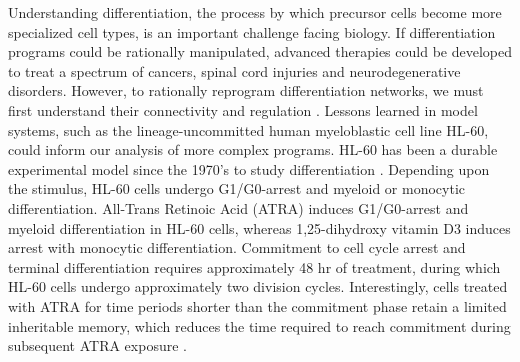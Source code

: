 \documentclass[12pt]{article}
\begin{document}
Understanding differentiation, 
the process by which precursor cells become more specialized cell types, 
is an important challenge facing biology. 
If differentiation programs could be rationally manipulated, 
advanced therapies could be developed to treat a spectrum of cancers, spinal cord injuries and neurodegenerative disorders. 
However, to rationally reprogram differentiation networks, 
we must first understand their connectivity and regulation \cite{Young2011}. 
Lessons learned in model systems, such as the lineage-uncommitted human myeloblastic cell line HL-60,
could inform our analysis of more complex programs. 
HL-60 has been a durable experimental model since the 1970's to study differentiation \cite{Breitman1980}.
Depending upon the stimulus, HL-60 cells undergo G1/G0-arrest and myeloid or monocytic differentiation. 
All-Trans Retinoic Acid (ATRA) induces G1/G0-arrest and myeloid differentiation in HL-60 cells, 
whereas 1,25-dihydroxy vitamin D3 induces arrest with monocytic differentiation.
Commitment to cell cycle arrest and terminal differentiation requires approximately 48 hr of treatment,
during which HL-60 cells undergo approximately two division cycles.  
Interestingly, cells treated with ATRA for time periods shorter than the commitment phase retain a limited inheritable memory, 
which reduces the time required to reach commitment during subsequent ATRA exposure \cite{YEN1984}.
\end{document}
